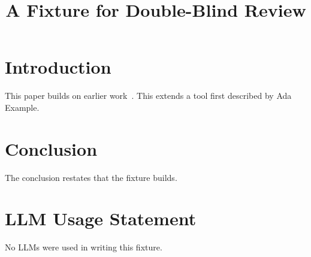 \documentclass[conference,compsoc]{IEEEtran}
\newcommand{\me}{Ada Example}
\begin{document}
\title{A Fixture for Double-Blind Review}
\author{}
\maketitle
\section{Introduction}
This paper builds on earlier work~\cite{knuth84}.
This extends a tool first described by \me.
\section{Conclusion}
The conclusion restates that the fixture builds.


\section*{LLM Usage Statement}
No LLMs were used in writing this fixture.
\end{document}
